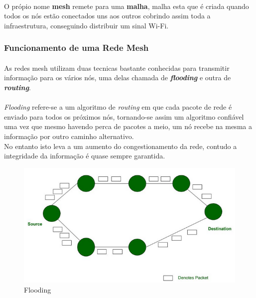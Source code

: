 \documentclass[letterpaper, 11pt]{article}
\begin{document}
\paragraph{}
O própio nome \textbf{mesh} remete para uma \textbf{malha}, malha esta que é criada quando todos os nós estão
conectados uns aos outros cobrindo assim toda a infraestrutura, conseguindo distribuir um sinal
Wi-Fi.


\subsubsection{Funcionamento de uma Rede Mesh}
\label{sec:orgc5a4c7c}

\paragraph{}
As redes mesh utilizam duas tecnicas bastante conhecidas para transmitir informação para os 
vários nós, uma delas chamada de \emph{\textbf{flooding}} e outra de \emph{\textbf{routing}}.

\paragraph{}
\emph{Flooding} refere-se a um algoritmo de \emph{routing} em que cada pacote de rede é enviado para todos os
próximos nós, tornando-se assim um algoritmo confiável uma vez que mesmo havendo perca de pacotes
a meio, um nó recebe na mesma a informação por outro caminho alternativo.\\
No entanto isto leva a um aumento do congestionamento da rede, contudo a integridade da informação é quase
sempre garantida.\\

\begin{figure}[htbp]
\centering
\includegraphics[width=10 cm]{imagens/flooding.png}
\caption{Flooding}
\end{figure}
\end{document}
